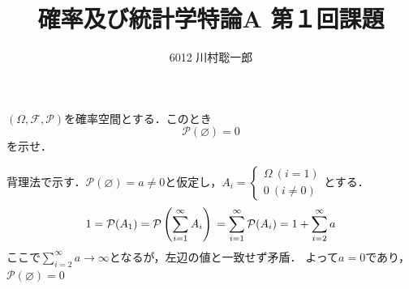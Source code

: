 \documentclass[dvipdfmx]{jsarticle}
\title{確率及び統計学特論A 第１回課題}
\author{6012 川村聡一郎}
\date{}
\newcommand{\F}{\mathcal{F}}
\renewcommand{\emptyset}{\varnothing} %
\begin{document}
\maketitle

\begin{tcolorbox}
	$(\Omega, \F, \mathcal{P})$を確率空間とする．このとき
\begin{equation} \tag{Ex}
	\mathcal{P}(\emptyset)= 0
\end{equation}
	を示せ．
\end{tcolorbox}

\begin{answer}
	背理法で示す．$\mathcal{P}(\emptyset)= a\ne 0$と仮定し，$A_i= \begin{cases}\Omega\ (i= 1)\\ 0\ (i\ne 0)\end{cases}$とする．
\begin{equation*}
	1
	= \mathcal{P}(A_1)
	= \mathcal{P}\left(\sum_{i= 1}^\infty A_i\right)\\
	= \sum_{i= 1}^\infty \mathcal{P}(A_i)\\
	= 1+ \sum_{i= 2}^\infty a
\end{equation*}
	ここで$\sum_{i= 2}^\infty a\to \infty$となるが，左辺の値と一致せず矛盾．
	よって$a= 0$であり，$\mathcal{P}(\emptyset)= 0$
\end{answer}
\end{document}
